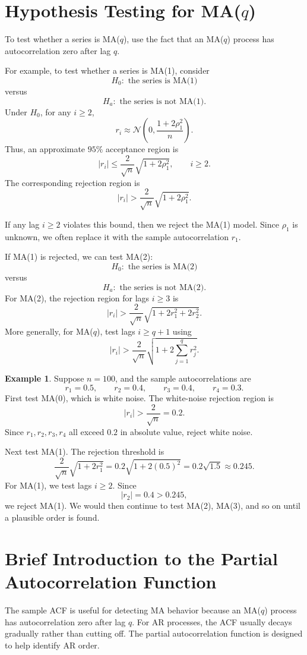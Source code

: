 \documentclass[12pt,oneside]{book}
\numberwithin{equation}{section}
\theoremstyle{definition}
\newtheorem{example}{Example}[section]
\theoremstyle{plain}
\theoremstyle{remark}
\newcommand{\Normal}{\mathcal{N}}
\begin{document}
\section{Hypothesis Testing for MA($q$)}

To test whether a series is MA($q$), use the fact that an MA($q$) process has autocorrelation zero after lag $q$.

For example, to test whether a series is MA(1), consider
\[
H_0:\text{ the series is MA(1)}
\]
versus
\[
H_a:\text{ the series is not MA(1)}.
\]
Under $H_0$, for any $i\geq 2$,
\[
r_i
\approx
\Normal\left(
0,
\frac{1+2\rho_1^2}{n}
\right).
\]
Thus, an approximate $95\%$ acceptance region is
\[
|r_i|
\leq
\frac{2}{\sqrt{n}}\sqrt{1+2\rho_1^2},
\qquad i\geq 2.
\]
The corresponding rejection region is
\[
|r_i|
>
\frac{2}{\sqrt{n}}\sqrt{1+2\rho_1^2}.
\]

If any lag $i\geq 2$ violates this bound, then we reject the MA(1) model. Since $\rho_1$ is unknown, we often replace it with the sample autocorrelation $r_1$.

If MA(1) is rejected, we can test MA(2):
\[
H_0:\text{ the series is MA(2)}
\]
versus
\[
H_a:\text{ the series is not MA(2)}.
\]
For MA(2), the rejection region for lags $i\geq 3$ is
\[
|r_i|
>
\frac{2}{\sqrt{n}}\sqrt{1+2r_1^2+2r_2^2}.
\]
More generally, for MA($q$), test lags $i\geq q+1$ using
\[
|r_i|
>
\frac{2}{\sqrt{n}}
\sqrt{
1+2\sum_{j=1}^{q}r_j^2
}.
\]

\begin{example}
Suppose $n=100$, and the sample autocorrelations are
\[
r_1=0.5,
\qquad
r_2=0.4,
\qquad
r_3=0.4,
\qquad
r_4=0.3.
\]
First test MA(0), which is white noise. The white-noise rejection region is
\[
|r_i|>\frac{2}{\sqrt{n}}=0.2.
\]
Since $r_1,r_2,r_3,r_4$ all exceed $0.2$ in absolute value, reject white noise.

Next test MA(1). The rejection threshold is
\[
\frac{2}{\sqrt{n}}\sqrt{1+2r_1^2}
=
0.2\sqrt{1+2(0.5)^2}
=
0.2\sqrt{1.5}
\approx 0.245.
\]
For MA(1), we test lags $i\geq 2$. Since
\[
|r_2|=0.4>0.245,
\]
we reject MA(1). We would then continue to test MA(2), MA(3), and so on until a plausible order is found.
\end{example}

\section*{Brief Introduction to the Partial Autocorrelation Function}

The sample ACF is useful for detecting MA behavior because an MA($q$) process has autocorrelation zero after lag $q$. For AR processes, the ACF usually decays gradually rather than cutting off. The partial autocorrelation function is designed to help identify AR order.
\end{document}
